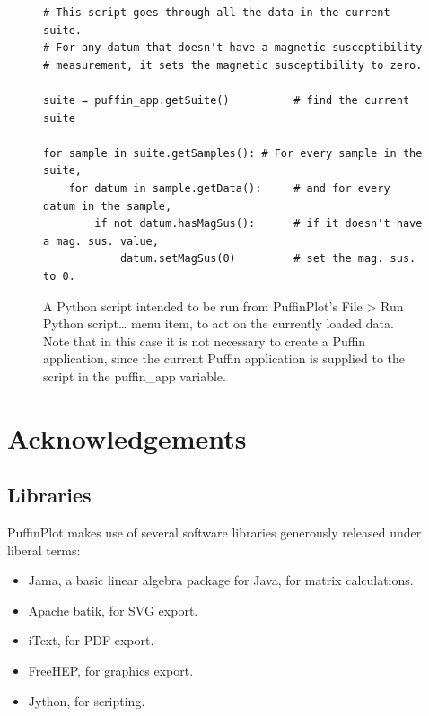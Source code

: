 \documentclass[a4paper,british]{article}
\newcommand{\ppcmd}[1]{\textsf{#1}} %
\newcommand{\caps}[1]{\MakeTextUppercase{#1}} %
\newcommand{\submenu}{ \textgreater{} } %
\begin{document}
\begin{figure}
  \caption{\label{fig:script-example-2} A Python script intended to be run
    from PuffinPlot's \ppcmd{File\submenu Run Python script\ldots} menu item,
    to act on the currently loaded data. Note that in this case it is not
    necessary to create a Puffin application, since the current Puffin
    application is supplied to the script in the \ppcmd{puffin\_app}
    variable. }
  \lstset{language=Python}
\begin{lstlisting}
# This script goes through all the data in the current suite.
# For any datum that doesn't have a magnetic susceptibility
# measurement, it sets the magnetic susceptibility to zero.

suite = puffin_app.getSuite()          # find the current suite

for sample in suite.getSamples(): # For every sample in the suite,
    for datum in sample.getData():     # and for every datum in the sample,
        if not datum.hasMagSus():      # if it doesn't have a mag. sus. value,
            datum.setMagSus(0)         # set the mag. sus. to 0.
\end{lstlisting}
\end{figure}


\section{Acknowledgements}

\subsection*{Libraries}

PuffinPlot makes use of several software libraries generously released under
liberal terms:

\begin{itemize}

\item Jama, a basic linear algebra package for Java, for matrix calculations.

\item Apache batik, for \caps{svg} export.

\item iText, for \caps{pdf} export.

\item FreeHEP, for graphics export.

\item Jython, for scripting.

\end{itemize}
\end{document}

